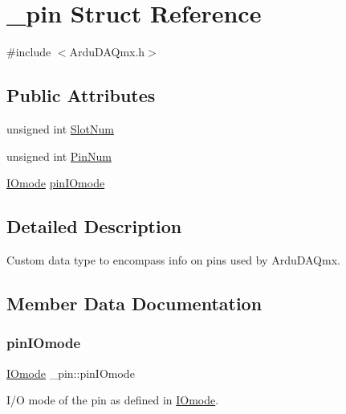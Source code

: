 \hypertarget{struct__pin}{}\section{\+\_\+pin Struct Reference}
\label{struct__pin}


{\ttfamily \#include $<$Ardu\+D\+A\+Qmx.\+h$>$}

\subsection*{Public Attributes}
\begin{DoxyCompactItemize}
\item 
unsigned int \mbox{\hyperlink{struct__pin_a8eb63758b00d61d9b187c101f899fcb2}{Slot\+Num}}
\item 
unsigned int \mbox{\hyperlink{struct__pin_a3f29982b035321c997878869cc6aa2d0}{Pin\+Num}}
\item 
\mbox{\hyperlink{_ardu_d_a_qmx_8h_a01bb22fd57ae799c4a23700042ce1155}{I\+Omode}} \mbox{\hyperlink{struct__pin_a0f07d492b225f0129c69ee5ce0799c2e}{pin\+I\+Omode}}
\end{DoxyCompactItemize}


\subsection{Detailed Description}
Custom data type to encompass info on pins used by Ardu\+D\+A\+Qmx. 

\subsection{Member Data Documentation}
\mbox{\label{struct__pin_a0f07d492b225f0129c69ee5ce0799c2e}} 
\subsubsection{\texorpdfstring{pin\+I\+Omode}{pinIOmode}}
{\footnotesize\ttfamily \mbox{\hyperlink{_ardu_d_a_qmx_8h_a01bb22fd57ae799c4a23700042ce1155}{I\+Omode}} \+\_\+pin\+::pin\+I\+Omode}

I/O mode of the pin as defined in \mbox{\hyperlink{_ardu_d_a_qmx_8h_a01bb22fd57ae799c4a23700042ce1155}{I\+Omode}}. \mbox{\label{struct__pin_a3f29982b035321c997878869cc6aa2d0}} 
